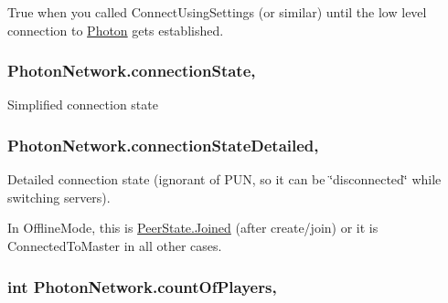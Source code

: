 True when you called Connect\+Using\+Settings (or similar) until the low level connection to \hyperlink{namespace_photon}{Photon} gets established. 

\subsubsection[{\texorpdfstring{connection\+State}{connectionState}}]{ Photon\+Network.\+connection\+State\hspace{0.3cm}{\ttfamily [static]}, {\ttfamily [get]}}\hypertarget{class_photon_network_aa2a46d8ce13fedd3f4550b6164524e81}{}\label{class_photon_network_aa2a46d8ce13fedd3f4550b6164524e81}


Simplified connection state 

\subsubsection[{\texorpdfstring{connection\+State\+Detailed}{connectionStateDetailed}}]{ Photon\+Network.\+connection\+State\+Detailed\hspace{0.3cm}{\ttfamily [static]}, {\ttfamily [get]}}\hypertarget{class_photon_network_a70403962dc524bb642e24de01b8fa43e}{}\label{class_photon_network_a70403962dc524bb642e24de01b8fa43e}


Detailed connection state (ignorant of P\+UN, so it can be \char`\"{}disconnected\char`\"{} while switching servers). 

In Offline\+Mode, this is \hyperlink{group__public_api_gga91cc003c03acb26c6f1530440ebdbc88a7d50c09f1ad7d098e0a847bcdcab7efb}{Peer\+State.\+Joined} (after create/join) or it is Connected\+To\+Master in all other cases. 
\subsubsection[{\texorpdfstring{count\+Of\+Players}{countOfPlayers}}]{\setlength{\rightskip}{0pt plus 5cm}int Photon\+Network.\+count\+Of\+Players\hspace{0.3cm}{\ttfamily [static]}, {\ttfamily [get]}}\hypertarget{class_photon_network_a56b04c065a4f5d54e3f9113056b32da2}{}\label{class_photon_network_a56b04c065a4f5d54e3f9113056b32da2}


